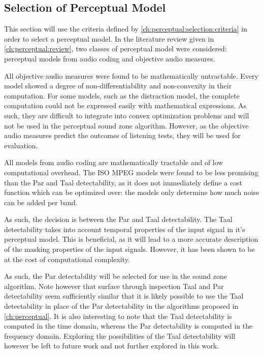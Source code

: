 \subsection{Selection of Perceptual Model}
\label{ch:perceptual:selection:selection}
This section will use the criteria defined by \autoref{ch:perceptual:selection:criteria} in order to select a perceptual
model.
In the literature review given in \autoref{ch:perceptual:review}, two classes of perceptual model were considered:
perceptual models from audio coding and objective audio measures.

All objective audio measures were found to be mathematically untractable. 
Every model showed a degree of non-differentiability and non-convexity in their computation.
For some models, such as the distraction model, the complete computation could not be expressed easily with mathematical expressions.
As such, they are difficult to integrate into convex optimization problems and will not be used in the perceptual sound zone algorithm.
However, as the objective audio measures predict the outcomes of listening tests, they will be used for evaluation.

All models from audio coding are mathematically tractable and of low computational overhead.
The ISO MPEG models were found to be less promising than the Par and Taal detectability, as it does not immediately 
define a cost function which can be optimized over:
the models only determine how much noise can be added per band.

As such, the decision is between the Par and Taal detectability.
The Taal detectability takes into account temporal properties of the input signal in it's perceptual model.
This is beneficial, as it will lead to a more accurate description of the masking properties of the input signals.
However, it has been shown to be at the cost of computational complexity.

As such, the Par detectability will be selected for use in the sound zone algorithm.
Note however that surface through inspection Taal and Par detectability seem sufficiently similar that it is likely
possible to use the Taal detectability in place of the Par detectability in the algorithms
proposed in \autoref{ch:perceptual}. 
It is also interesting to note that the Taal detectability is computed in the time domain, whereas the 
Par detectability is computed in the frequency domain.
Exploring the possibilities of the Taal detectability will however be left to future work and not further explored in this
work.
